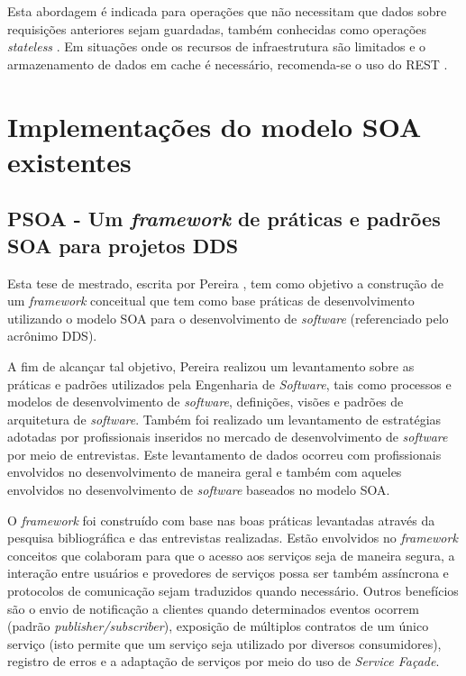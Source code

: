 Esta abordagem é indicada para operações que não necessitam que dados sobre requisições anteriores sejam guardadas, também conhecidas como operações \textit{stateless} \cite{rozlog_restesoap_2013}. Em situações onde os recursos de infraestrutura são limitados e o armazenamento de dados em cache é necessário, recomenda-se o uso do REST \cite{rozlog_restesoap_2013}.

\section{Implementações do modelo SOA existentes}

\subsection{PSOA - Um \textit{framework} de práticas e padrões SOA para projetos DDS}

Esta tese de mestrado, escrita por Pereira \cite{pereira_psoa_2011}, tem como objetivo a construção de um \textit{framework} conceitual que tem como base práticas de desenvolvimento utilizando o modelo SOA para o desenvolvimento de \textit{software} (referenciado pelo acrônimo DDS).

A fim de alcançar tal objetivo, Pereira \cite{pereira_psoa_2011} realizou um levantamento sobre as práticas e padrões utilizados pela Engenharia de \textit{Software}, tais como processos e modelos de desenvolvimento de \textit{software}, definições, visões e padrões de arquitetura de \textit{software}. Também foi realizado um levantamento de estratégias adotadas por profissionais inseridos no mercado de desenvolvimento de \textit{software} por meio de entrevistas. Este levantamento de dados ocorreu com profissionais envolvidos no desenvolvimento de maneira geral e também com aqueles envolvidos no desenvolvimento de \textit{software} baseados no modelo SOA.

O \textit{framework} foi construído com base nas boas práticas levantadas através da pesquisa bibliográfica e das entrevistas realizadas. Estão envolvidos no \textit{framework} conceitos que colaboram para que o acesso aos serviços seja de maneira segura, a interação entre usuários e provedores de serviços possa ser também assíncrona e protocolos de comunicação sejam traduzidos quando necessário. Outros benefícios são o envio de notificação a clientes quando determinados eventos ocorrem (padrão \textit{publisher/subscriber}), exposição de múltiplos contratos de um único serviço (isto permite que um serviço seja utilizado por diversos consumidores), registro de erros e a adaptação de serviços por meio do uso de \textit{Service Façade}.

